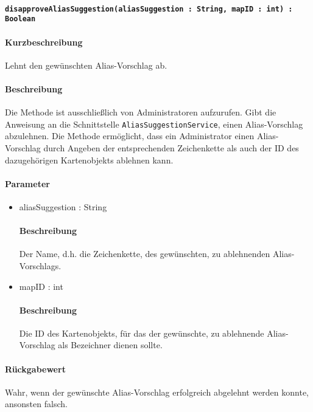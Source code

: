 \paragraph*{\texttt{disapproveAliasSuggestion(aliasSuggestion : String, mapID : int) : Boolean}}%
\paragraph*{Kurzbeschreibung}
Lehnt den gewünschten Alias-Vorschlag ab.
\paragraph*{Beschreibung}
Die Methode ist ausschließlich von Administratoren aufzurufen.
Gibt die Anweisung an die Schnittstelle \texttt{AliasSuggestionService}, einen Alias-Vorschlag abzulehnen.
Die Methode ermöglicht, dass ein Administrator einen Alias-Vorschlag durch Angeben der entsprechenden Zeichenkette als auch der ID des dazugehörigen Kartenobjekts ablehnen kann.
\paragraph*{Parameter}
\begin{itemize}
	\item aliasSuggestion : String
		\paragraph*{Beschreibung}
		Der Name, d.h. die Zeichenkette, des gewünschten, zu ablehnenden Alias-Vorschlags.
	\item mapID : int
		\paragraph*{Beschreibung}
		Die ID des Kartenobjekts, für das der gewünschte, zu ablehnende Alias-Vorschlag als Bezeichner dienen sollte.
\end{itemize}
\paragraph*{Rückgabewert}
Wahr, wenn der gewünschte Alias-Vorschlag erfolgreich abgelehnt werden konnte, ansonsten falsch.
